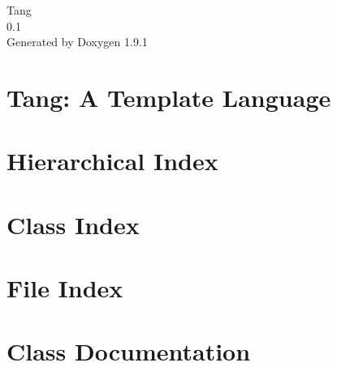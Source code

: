 \let\mypdfximage\pdfximage\def\pdfximage{\immediate\mypdfximage}\documentclass[twoside]{book}
\newcommand{\+}{\discretionary{\mbox{\scriptsize$\hookleftarrow$}}{}{}}
\newcommand{\clearemptydoublepage}{%
  \newpage{\pagestyle{empty}\cleardoublepage}%
}
\begin{document}
\raggedbottom

\hypersetup{pageanchor=false,
             bookmarksnumbered=true,
             pdfencoding=unicode
            }
\begin{titlepage}
\vspace*{7cm}
\begin{center}%
{\Large Tang \\[1ex]\large 0.\+1 }\\
\vspace*{1cm}
{\large Generated by Doxygen 1.9.1}\\
\end{center}
\end{titlepage}
\clearemptydoublepage
{}
\tableofcontents
\clearemptydoublepage
{}
\hypersetup{pageanchor=true}

\chapter{Tang\+: A Template Language}
\label{index}\hypertarget{index}{}
\chapter{Hierarchical Index}

\chapter{Class Index}

\chapter{File Index}

\chapter{Class Documentation}





















\end{document}
